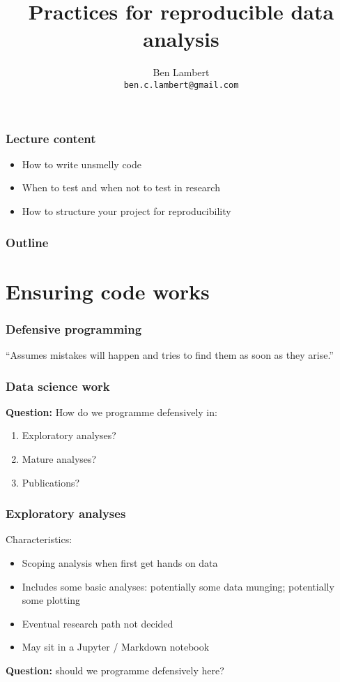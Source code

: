 \documentclass[handout]{beamer}
\title{Practices for reproducible data analysis}
\author[Ben Lambert]{Ben Lambert\inst{1}\\ \texttt{ben.c.lambert@gmail.com}}
\date{\displaydate{date}}
\institute[University of Oxford]{
\inst{1}University of Oxford}
\begin{document}
\begin{frame}
\titlepage
\end{frame}

\begin{frame}
	\frametitle{Lecture content}
	
	\begin{itemize}
		\item How to write unsmelly code
		\item When to test and when not to test in research
		\item How to structure your project for reproducibility
	\end{itemize}
	
\end{frame}

\begin{frame}
	\frametitle{Outline}
	\tableofcontents
\end{frame}

\section{Ensuring code works}

\begin{frame}
	\frametitle{Defensive programming}
	
	\Large
	``Assumes mistakes will happen and tries to find them as soon as they arise.''
	
\end{frame}

\begin{frame}
	\frametitle{Data science work}
	
	\textbf{Question:} How do we programme defensively in:
	
	\begin{enumerate}
		\item Exploratory analyses?
		\item Mature analyses?
		\item Publications?
	\end{enumerate}
	
\end{frame}

\begin{frame}
	\frametitle{Exploratory analyses}
	
	Characteristics:
	
	\begin{itemize}
		\item Scoping analysis when first get hands on data
		\item Includes some basic analyses: potentially some data munging; potentially some plotting
		\item Eventual research path not decided
		\item May sit in a Jupyter / Markdown notebook
	\end{itemize}
	
	\textbf{Question:} should we programme defensively here?
	
\end{frame}
\end{document}
